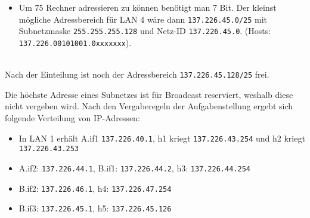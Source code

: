 \documentclass{../exercisesheet}
\begin{document}
\begin{exercise}{4}
\begin{subexercise}
\begin{itemize}
\item Um 75 Rechner adressieren zu können benötigt man 7 Bit. Der kleinst mögliche Adressbereich für LAN 4 wäre dann \texttt{137.226.45.0/25} mit Subnetzmaske 
	\texttt{255.255.255.128} und Netz-ID \texttt{137.226.45.0}. (Hosts: \texttt{137.226.00101001.0xxxxxxx}).
\end{itemize}
\ \\Nach der Einteilung ist noch der Adressbereich \texttt{137.226.45.128/25} frei.
\end{subexercise}
\begin{subexercise}
Die höchste Adresse eines Subnetzes ist für Broadcast reserviert, weshalb diese nicht vergeben wird. Nach den Vergaberegeln der Aufgabenstellung ergebt sich folgende Verteilung von
IP-Adressen:
\begin{itemize}
\item In LAN 1 erhält A.if1 \texttt{137.226.40.1}, h1 kriegt \texttt{137.226.43.254} und h2 kriegt \texttt{137.226.43.253}
\item A.if2: \texttt{137.226.44.1}, B.if1: \texttt{137.226.44.2}, h3: \texttt{137.226.44.254}
\item B.if2: \texttt{137.226.46.1}, h4: \texttt{137.226.47.254}
\item B.if3: \texttt{137.226.45.1}, h5: \texttt{137.226.45.126}
\end{itemize}
\end{subexercise}
\end{exercise}
\end{document}
